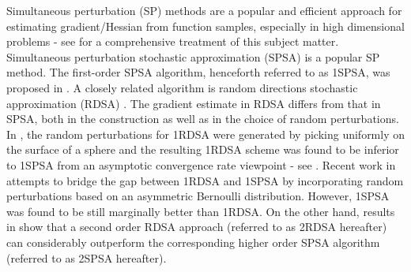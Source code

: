 \documentclass[letterpaper, 10 pt, conference]{ieeeconf}  %
\begin{document}
Simultaneous perturbation (SP) methods are a popular and efficient approach for estimating gradient/Hessian from function samples, especially in high dimensional problems - see \cite{bhatnagar-book} for a comprehensive treatment of this subject matter. 
Simultaneous perturbation stochastic approximation (SPSA) is a popular SP method. The first-order SPSA algorithm, henceforth referred to as 1SPSA, was proposed in \cite{spall}.  A closely related algorithm is random directions stochastic approximation (RDSA) \cite[pp.~58-60]{kushcla}. The gradient estimate in RDSA differs from that in SPSA, both in the construction as well as in the choice of random perturbations.  In \cite{kushcla}, the random perturbations for 1RDSA were generated by picking uniformly on the surface of a sphere and the resulting 1RDSA scheme was found to be  inferior to 1SPSA from an asymptotic convergence rate viewpoint - see \cite{chin1997comparative}.  Recent work in \cite{prashanth2015rdsa} attempts to bridge the gap between 1RDSA and 1SPSA by incorporating random perturbations based on an asymmetric Bernoulli distribution. However,  1SPSA was found to be still marginally better than 1RDSA.  On the other hand, results in \cite{prashanth2015rdsa} show that a second order RDSA approach (referred to as 2RDSA hereafter) can considerably outperform the corresponding higher order SPSA algorithm \cite{spall_adaptive} (referred to as 2SPSA hereafter). 
\end{document}
